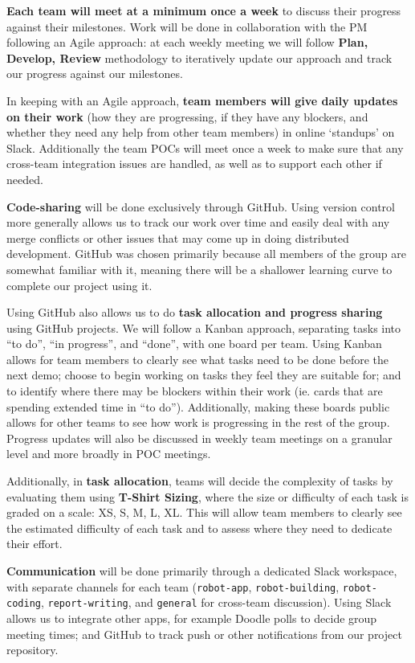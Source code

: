 \documentclass{article}
\begin{document}
{\bf Each team will meet at a minimum once a week} to discuss their progress against their milestones. Work will be done in collaboration with the PM following an Agile approach: at each weekly meeting we will follow {\bf Plan, Develop, Review} methodology to iteratively update our approach and track our progress against our milestones.

In keeping with an Agile approach, {\bf team members will give daily updates on their work} (how they are progressing, if they have any blockers, and whether they need any help from other team members) in online `standups' on Slack. Additionally the team POCs will meet once a week to make sure that any cross-team integration issues are handled, as well as to support each other if needed. 

{\bf Code-sharing} will be done exclusively through GitHub. Using version control more generally allows us to track our work over time and easily deal with any merge conflicts or other issues that may come up in doing distributed development. GitHub was chosen primarily because all members of the group are somewhat familiar with it, meaning there will be a shallower learning curve to complete our project using it. 

Using GitHub also allows us to do {\bf task allocation and progress sharing} using GitHub projects. We will follow a Kanban approach, separating tasks into ``to do'', ``in progress'', and ``done'', with one board per team. Using Kanban allows for team members to clearly see what tasks need to be done before the next demo; choose to begin working on tasks they feel they are suitable for; and to identify where there may be blockers within their work (ie. cards that are spending extended time in ``to do''). Additionally, making these boards public allows for other teams to see how work is progressing in the rest of the group. Progress updates will also be discussed in weekly team meetings on a granular level and more broadly in POC meetings.

Additionally, in {\bf task allocation}, teams will decide the complexity of tasks by evaluating them using {\bf T-Shirt Sizing}, where the size or difficulty of each task is graded on a scale: XS, S, M, L, XL. This will allow team members to clearly see the estimated difficulty of each task and to assess where they need to dedicate their effort. 

{\bf Communication} will be done primarily through a dedicated Slack workspace, with separate channels for each team ({\tt robot-app}, {\tt robot-building}, {\tt robot-coding}, {\tt report-writing}, and {\tt general} for cross-team discussion). Using Slack allows us to integrate other apps, for example Doodle polls to decide group meeting times; and GitHub to track push or other notifications from our project repository. 




\end{document}
